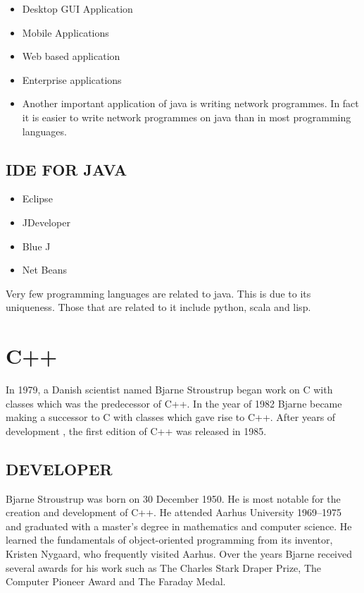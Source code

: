 \documentclass{article}
\begin{document}
\begin{itemize}
	\item Desktop GUI Application
	\item Mobile Applications
	\item Web based application
	\item Enterprise applications
	\item Another important application of java is writing network programmes. In fact it is easier to write network programmes on java than in most programming languages.
		\end{itemize}
	
	\subsection{IDE FOR JAVA}
	\begin{itemize}
		\item Eclipse
		\item JDeveloper
		\item Blue J
		\item Net Beans
		
	\end{itemize}
	
	Very few programming languages are related to java. This is due to its uniqueness. Those that are related to it include python, scala and lisp.
	
	\section{C++}
		In 1979, a Danish scientist named  Bjarne Stroustrup began work on C with classes which was the predecessor of C++. In the year of 1982 Bjarne became making a successor to C with classes which gave rise to C++. After years of development , the first edition of C++ was released in 1985.
		
		\subsection{DEVELOPER}
		Bjarne Stroustrup was born on 30 December 1950. He is most notable for the creation and development of C++. He attended Aarhus University 1969–1975 and graduated with a master's degree in mathematics and computer science. He learned the fundamentals of object-oriented programming from its inventor, Kristen Nygaard, who frequently visited Aarhus.
		Over the years Bjarne received several awards for his work such as The Charles Stark Draper Prize, The Computer Pioneer Award and The Faraday Medal.
		
\end{document}
